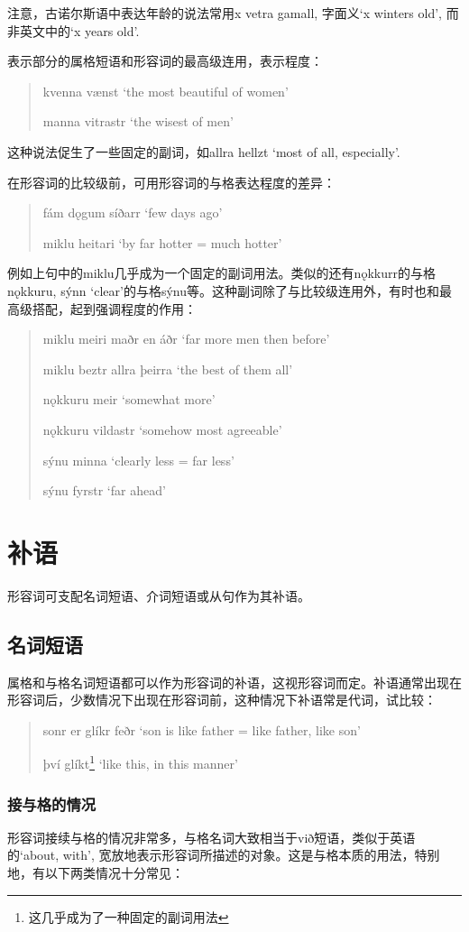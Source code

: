 注意，古诺尔斯语中表达年龄的说法常用x vetra gamall, 字面义`x winters old', 而非英文中的`x years old'.

表示部分的属格短语和形容词的最高级连用，表示程度：
\begin{quote}
    kvenna vænst `the most beautiful of women'

    manna vitrastr `the wisest of men'
\end{quote}
这种说法促生了一些固定的副词，如allra hellzt `most of all, especially'.

在形容词的比较级前，可用形容词的与格表达程度的差异：
\begin{quote}
    fám dǫgum síðarr `few days ago'

    miklu heitari `by far hotter = much hotter'
\end{quote}
例如上句中的miklu几乎成为一个固定的副词用法。类似的还有nǫkkurr的与格nǫkkuru, sýnn `clear'的与格sýnu等。这种副词除了与比较级连用外，有时也和最高级搭配，起到强调程度的作用：
\begin{quote}
    miklu meiri maðr en áðr `far more men then before'

    miklu beztr allra þeirra `the best of them all'

    nǫkkuru meir `somewhat more'

    nǫkkuru vildastr `somehow most agreeable'

    sýnu minna `clearly less = far less'

    sýnu fyrstr `far ahead'
\end{quote}

\section{补语}
形容词可支配名词短语、介词短语或从句作为其补语。
\subsection{名词短语}
属格和与格名词短语都可以作为形容词的补语，这视形容词而定。补语通常出现在形容词后，少数情况下出现在形容词前，这种情况下补语常是代词，试比较：
\begin{quote}
    sonr er glíkr feðr `son is like father = like father, like son'

    því glíkt\footnote{这几乎成为了一种固定的副词用法} `like this, in this manner'
\end{quote}
\subsubsection*{接与格的情况}
形容词接续与格的情况非常多，与格名词大致相当于við短语，类似于英语的`about, with', 宽放地表示形容词所描述的对象。这是与格本质的用法，特别地，有以下两类情况十分常见：

